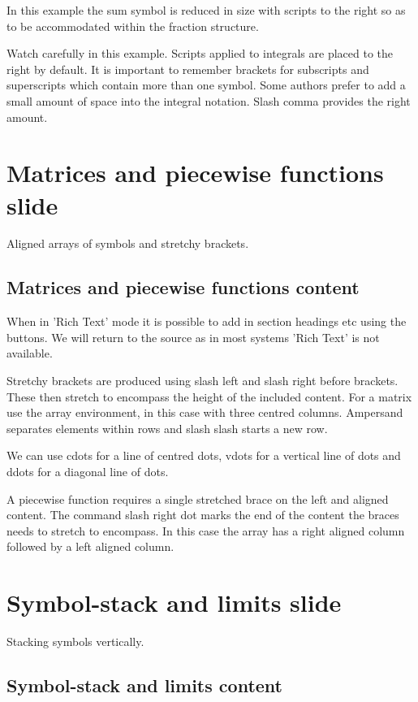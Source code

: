 \documentclass[a4paper,14pt]{extarticle}
\begin{document}
In this example the sum symbol is reduced in size with scripts to the right so as to be accommodated within the fraction structure. 

Watch carefully in this example. Scripts applied to integrals are placed to the right by default. It is important to remember brackets for subscripts and superscripts which contain more than one symbol. Some authors prefer to add a small amount of space into the integral notation. Slash comma provides the right amount. 

\section{Matrices and piecewise functions slide}

Aligned arrays of symbols and stretchy brackets. 

\subsection{Matrices and piecewise functions content}

When in 'Rich Text' mode it is possible to add in section headings etc using the buttons. We will return to the source as in most systems 'Rich Text' is not available. 

Stretchy brackets are produced using slash left and slash right before brackets. These then stretch to encompass the height of the included content. For a matrix use the array environment, in this case with three centred columns. Ampersand separates elements within rows and slash slash starts a new row. 

We can use cdots for a line of centred dots, vdots for a vertical line of dots and ddots for a diagonal line of dots. 

A piecewise function requires a single stretched brace on the left and aligned content. The command slash right dot marks the end of the content the braces needs to stretch to encompass. In this case the array has a right aligned column followed by a left aligned column. 

\section{Symbol-stack and limits slide}

Stacking symbols vertically. 

\subsection{Symbol-stack and limits content}
\end{document}
